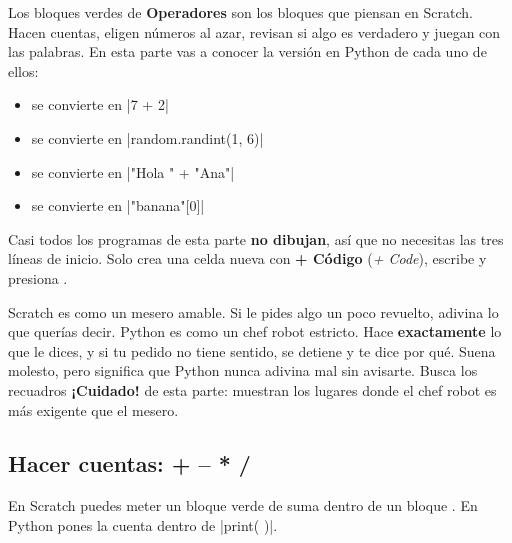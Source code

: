 
Los bloques verdes de \textbf{Operadores} son los bloques que piensan en Scratch. Hacen cuentas, eligen números al azar, revisan si algo es verdadero y juegan con las palabras. En esta parte vas a conocer la versión en Python de cada uno de ellos:

\begin{itemize}
  \item {} se convierte en \py|7 + 2|
  \item {} se convierte en \py|random.randint(1, 6)|
  \item {} se convierte en \py|"Hola " + "Ana"|
  \item {} se convierte en \py|"banana"[0]|
\end{itemize}

Casi todos los programas de esta parte \textbf{no dibujan}, así que no necesitas las tres líneas de inicio. Solo crea una celda nueva con \textbf{+ Código} (\emph{+ Code}), escribe y presiona \playbtn.

\begin{think}
Scratch es como un mesero amable. Si le pides algo un poco revuelto, adivina lo que querías decir. Python es como un chef robot estricto. Hace \textbf{exactamente} lo que le dices, y si tu pedido no tiene sentido, se detiene y te dice por qué. Suena molesto, pero significa que Python nunca adivina mal sin avisarte. Busca los recuadros \textbf{¡Cuidado!} de esta parte: muestran los lugares donde el chef robot es más exigente que el mesero.
\end{think}

\subsection*{Hacer cuentas: + -- * /}

En Scratch puedes meter un bloque verde de suma dentro de un bloque . En Python pones la cuenta dentro de \py|print( )|.

